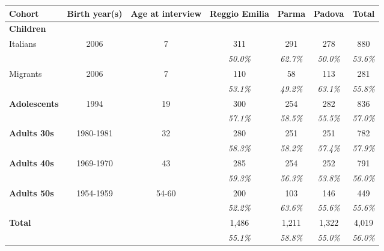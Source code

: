 \begin{tabular}{l c c c c c c}
\toprule
Cohort & Birth year(s) & Age at interview & Reggio Emilia & Parma & Padova & Total \\			
\midrule
\textbf{Children} &  &  &  & &  &  \\
\quad Italians & 2006 & 7 & 311 & 291& 278 & 880 \\
			&&	& \textit{50.0\%} &  \textit{62.7\%} &  \textit{50.0\%} &  \textit{53.6\%} \\
\quad Migrants & 2006 & 7 & 110 & 58 & 113 & 281 \\
			&& 	&  \textit{53.1\%} &  \textit{49.2\%} &  \textit{63.1\%} &  \textit{55.8\%} \\
\textbf{Adolescents} & 1994 & 19 & 300 & 254 & 282 & 836 \\
			&& 	&  \textit{57.1\%} &  \textit{58.5\%} &  \textit{55.5\%} &  \textit{57.0\%} \\
\textbf{Adults 30s} & 1980-1981 & 32 & 280 & 251 & 251 & 782 \\
			&& 	&  \textit{58.3\%} &  \textit{58.2\%} &  \textit{57.4\%} &  \textit{57.9\%} \\
\textbf{Adults 40s} & 1969-1970 & 43 & 285 & 254 & 252 & 791 \\
			&& 	&  \textit{59.3\%} &  \textit{56.3\%} &  \textit{53.8\%} &  \textit{56.0\%}\\
\textbf{Adults 50s} & 1954-1959 & 54-60 & 200 & 103 & 146 & 449 \\
			&& 	&  \textit{52.2\%} &  \textit{63.6\%} &  \textit{55.6\%}  &  \textit{55.6\%}\\
\midrule
\textbf{Total}	& 				& & 1,486 & 1,211 & 1,322 & 4,019 \\
			&&				& \textit{55.1\%} &  \textit{58.8\%} &  \textit{55.0\%} & \textit{56.0\%} \\
\bottomrule
\end{tabular}
